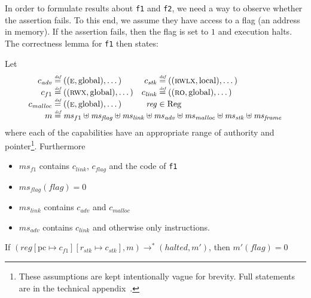 \documentclass[acmsmall,review]{acmart}\settopmatter{printfolios=true}
\newcommand{\update}[2]{[#1 \mapsto #2]}
\newcommand{\defeq}{\stackrel{\textit{\tiny{def}}}{=}}
\newcommand{\var}[1]{\mathit{#1}}
\newcommand{\hs}{\var{ms}}
\newcommand{\ms}{\hs}
\newcommand{\pcreg}{\mathrm{pc}}
\newcommand{\reg}{\var{reg}}
\newcommand{\adv}{\var{adv}}
\newcommand{\link}{\var{link}}
\newcommand{\stk}{\var{stk}}
\newcommand{\flag}{\var{flag}}
\newcommand{\halted}{\mathit{halted}}
\newcommand{\codelabel}[1]{\mathit{#1}}
\newcommand{\malloc}{\codelabel{malloc}}
\newcommand{\plaindom}[1]{\mathrm{#1}}
\newcommand{\Regs}{\plaindom{Reg}}
\newcommand{\plainperm}[1]{\textsc{#1}}
\newcommand{\readonly}{\plainperm{ro}}
\newcommand{\entry}{\plainperm{e}}
\newcommand{\rwx}{\plainperm{rwx}}
\newcommand{\rwlx}{\plainperm{rwlx}}
\newcommand{\plainlocality}[1]{\mathrm{#1}}
\newcommand{\local}{\plainlocality{local}}
\newcommand{\glob}{\plainlocality{global}}
\newcommand{\step}[1][]{\rightarrow_{#1}}
\begin{document}
In order to formulate results about \texttt{\footnotesize{f1}} and
\texttt{\footnotesize{f2}}, we need a way to observe whether the assertion
fails. To this end, we assume they have access to a flag (an address in memory).
If the assertion fails, then the flag is set to $1$ and execution halts. The correctness lemma
for \texttt{\footnotesize{f1}} then states:
\begin{lemma}
  \label{lem:correctness-f1}
  Let
\[
    \begin{array}{r@{}lr@{}l}
    c_\adv & \;\defeq ((\entry,\glob),\dots) & c_{\var{stk}} & \;\defeq ((\rwlx,\local),\dots)\\
    c_{f1} & \;\defeq ((\rwx,\glob),\dots) & c_\link &\; \defeq ((\readonly,\glob),\dots)\\
    c_\malloc &\; \defeq ((\entry,\glob),\dots) & \reg& \; \in \Regs \\
    m &  \multicolumn{3}{@{}l}{\;\defeq \ms_{f1} \uplus \ms_\flag \uplus \ms_{\var{link}} \uplus \hs_\adv \uplus \ms_{\malloc} \uplus \ms_{\var{stk}} \uplus \ms_{\var{frame}}} \\
    \end{array}
\]
where each of the capabilities have an appropriate range of authority and
pointer\footnote{These assumptions are kept intentionally vague for brevity.
  Full statements are in the technical appendix~\citep{technical_appendix}.}.
Furthermore
  \begin{itemize}
  \item $\ms_{f1}$ contains $c_\link$, $c_\flag$ and the code of \texttt{\footnotesize{f1}}
  \item $\ms_\flag(\flag) = 0$
  \item $\ms_{\var{link}}$ contains $c_\adv$ and $c_\malloc$
  \item $\hs_\adv$ contains $c_\link$ and otherwise only instructions.
  \end{itemize}
  If $(\reg\update{\pcreg}{c_{f1}}\update{r_\stk}{c_\stk},m) \step^* (\halted,m')$,
  then $m'(\flag) = 0$
\end{lemma}
\end{document}
